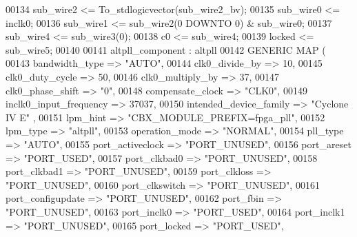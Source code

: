 \begin{DoxyCode}
{00134     \textcolor{vhdlchar}{sub_wire2}    \textcolor{vhdlchar}{<=} \textcolor{vhdlchar}{To\_stdlogicvector}\textcolor{vhdlchar}{(}\textcolor{vhdlchar}{sub_wire2_bv}\textcolor{vhdlchar}{)};
00135     \textcolor{vhdlchar}{sub_wire0}    \textcolor{vhdlchar}{<=} \textcolor{vhdlchar}{inclk0};
00136     \textcolor{vhdlchar}{sub_wire1}    \textcolor{vhdlchar}{<=} \textcolor{vhdlchar}{sub_wire2}\textcolor{vhdlchar}{(}\textcolor{vhdllogic}{}\textcolor{vhdllogic}{0} \textcolor{keywordflow}{DOWNTO} \textcolor{vhdllogic}{}\textcolor{vhdllogic}{0}\textcolor{vhdlchar}{)} \textcolor{vhdlchar}{&} \textcolor{vhdlchar}{sub_wire0};
00137     \textcolor{vhdlchar}{sub_wire4}    \textcolor{vhdlchar}{<=} \textcolor{vhdlchar}{sub_wire3}\textcolor{vhdlchar}{(}\textcolor{vhdllogic}{}\textcolor{vhdllogic}{0}\textcolor{vhdlchar}{)};
00138     \textcolor{vhdlchar}{c0}    \textcolor{vhdlchar}{<=} \textcolor{vhdlchar}{sub_wire4};
00139     locked    <= sub\_wire5;
00140 
00141     altpll_component : altpll
00142     \textcolor{keywordflow}{GENERIC} \textcolor{keywordflow}{MAP} (
00143         bandwidth\_type => \textcolor{keyword}{"AUTO"},
00144         clk0\_divide\_by => \textcolor{vhdllogic}{10},
00145         clk0\_duty\_cycle => \textcolor{vhdllogic}{50},
00146         clk0\_multiply\_by => \textcolor{vhdllogic}{37},
00147         clk0\_phase\_shift => "\textcolor{vhdllogic}{0}",
00148         compensate\_clock => \textcolor{keyword}{"CLK0"},
00149         inclk0\_input\_frequency => \textcolor{vhdllogic}{37037},
00150         intended\_device\_family => \textcolor{keyword}{"Cyclone IV E"}  ,
00151         lpm\_hint => \textcolor{keyword}{"CBX\_MODULE\_PREFIX=fpga\_pll"},
00152         lpm\_type => \textcolor{keyword}{"altpll"},
00153         operation\_mode => \textcolor{keyword}{"NORMAL"},
00154         pll\_type => \textcolor{keyword}{"AUTO"},
00155         port\_activeclock => \textcolor{keyword}{"PORT\_UNUSED"},
00156         port\_areset => \textcolor{keyword}{"PORT\_USED"},
00157         port\_clkbad0 => \textcolor{keyword}{"PORT\_UNUSED"},
00158         port\_clkbad1 => \textcolor{keyword}{"PORT\_UNUSED"},
00159         port\_clkloss => \textcolor{keyword}{"PORT\_UNUSED"},
00160         port\_clkswitch => \textcolor{keyword}{"PORT\_UNUSED"},
00161         port\_configupdate => \textcolor{keyword}{"PORT\_UNUSED"},
00162         port\_fbin => \textcolor{keyword}{"PORT\_UNUSED"},
00163         port\_inclk0 => \textcolor{keyword}{"PORT\_USED"},
00164         port\_inclk1 => \textcolor{keyword}{"PORT\_UNUSED"},
00165         port\_locked => \textcolor{keyword}{"PORT\_USED"},
}
\end{DoxyCode}
